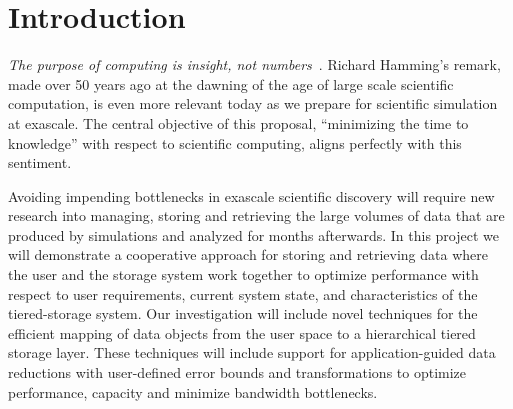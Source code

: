 \section{Introduction} 
\label{sec:introduction}

{\em The purpose of computing is insight, not numbers}~\cite{Hamming:book}.
Richard Hamming's remark, made over 50 years ago at the dawning of the age of
large scale scientific computation, is even more relevant today as we prepare
for scientific simulation at exascale. 
The central objective of this proposal, ``minimizing the time to knowledge''  
with respect to scientific computing, aligns perfectly with this sentiment. 

Avoiding impending bottlenecks in exascale scientific discovery will require
new research into managing, storing and retrieving the large volumes of data that are 
produced by simulations and analyzed for months afterwards.
%
In this project we will demonstrate a cooperative approach for storing and retrieving  data
where the user and the storage system work together to optimize performance with
respect to user requirements, current system state, and characteristics of the tiered-storage system.
Our investigation will include  novel techniques for the efficient mapping of data objects
from the user space to a hierarchical tiered storage layer. These techniques will
include support for application-guided data reductions with user-defined error bounds
and transformations to optimize performance, capacity and minimize bandwidth bottlenecks.

